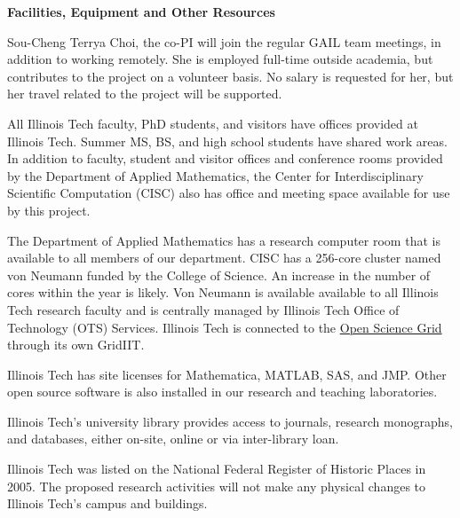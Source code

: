 \documentclass[11pt]{NSFamsart}
\begin{document}

\centerline{\textbf{\Large Facilities, Equipment and Other Resources}}

\bigskip

Sou-Cheng Terrya Choi, the co-PI will join the regular GAIL team meetings, in addition to working 
remotely.  She is employed full-time outside academia, but contributes to the project on a volunteer 
basis.  No salary is requested for her, but her travel related to the project will be supported.

All Illinois Tech faculty, PhD students, and visitors have offices provided at Illinois Tech.  Summer 
MS, BS, and high school students have shared work areas.  In addition to faculty, student and visitor 
offices and conference rooms provided by the Department of Applied Mathematics, the Center for 
Interdisciplinary Scientific Computation (CISC) also has office and meeting space available for use 
by this project.

The Department of Applied Mathematics has a research computer room that is available to all 
members of our department.  CISC has a 256-core cluster named von Neumann funded by the 
College of Science.  An increase in the number of cores within the year is likely. Von Neumann is 
available available to all Illinois Tech research faculty and is
centrally managed by Illinois Tech Office of Technology (OTS) Services.  Illinois Tech is connected 
to the \href{https://www.opensciencegrid.org}{Open Science Grid} through its own GridIIT.  

Illinois Tech has site licenses for Mathematica, MATLAB, SAS, and JMP.  Other open source 
software is also installed in our research and teaching laboratories.

Illinois Tech's university library provides access to journals, research monographs, and 
databases, either on-site, online or via inter-library loan.

Illinois Tech was listed on the National Federal Register of Historic Places in 2005. The proposed 
research activities will not make any physical changes to Illinois Tech's campus and buildings.
\end{document}
